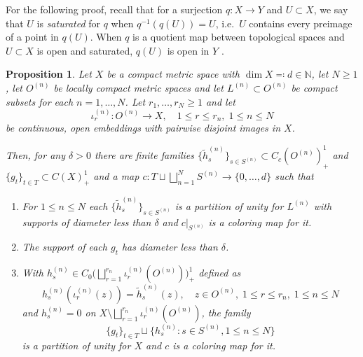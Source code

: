 \documentclass[11pt,a4paper]{amsart}
\newtheorem{proposition}[theorem]{Proposition}
\theoremstyle{definition}
\numberwithin{equation}{section}
\newcommand{\bb}[1]{\mathbb{#1}}
\begin{document}
For the following proof, recall that for a surjection $q\colon X\to Y$ and $U\subset X$, we say that $U$ is \emph{saturated} for $q$ when $q^{-1}(q(U))=U$, i.e.\ $U$ contains every preimage of a point in $q(U)$. When $q$ is a quotient map between topological spaces and $U\subset X$ is open and saturated, $q(U)$ is open in $Y$ \cite{Munkres00}.


\begin{proposition}\label{prop:POU}
Let $X$ be a compact metric space with $\dim X\eqqcolon d\in\bb{N}$, let $N\ge1$, let $O^{(n)}$ be locally compact metric spaces and let $L^{(n)}\subset O^{(n)}$ be compact subsets for each $n=1,\dots,N$. Let $r_1,\dots,r_N\ge 1$ and let
\begin{equation}
\iota_r^{(n)}\colon O^{(n)}\to X,\quad 1\le r\le r_n,\; 1\le n\le N
\end{equation}
be continuous, open embeddings with pairwise disjoint images in $X$.

Then, for any $\delta>0$ there are finite families $\{\tilde{h}_s^{(n)}\}_{s\in S^{(n)}}\subset C_c(O^{(n)})_+^1$ and $\{g_t\}_{t\in T}\subset C(X)_+^1$ and a map $c\colon T\sqcup\bigsqcup_{n=1}^NS^{(n)}\to\{0,\dots,d\}$ such that
\begin{enumerate}[label=\normalfont{(\roman*)}]
\item\label{item:lemmaPOW-2} For $1\le n\le N$ each $\{\tilde{h}_s^{(n)}\}_{s\in S^{(n)}}$ is a partition of unity for $L^{(n)}$ with supports of diameter less than $\delta$ and $c\vert_{S^{(n)}}$ is a coloring map for it.

\item\label{item:lemmaPOW-1} The support of each $g_t$ has diameter less than $\delta$.

\item\label{item:lemmaPOW-3} With $h_s^{(n)}\in C_0\big(\bigsqcup_{r=1}^{r_n}\iota_r^{(n)}(O^{(n)})\big)_+^1$ defined as 
\begin{equation}\label{eq:def-POW-altogether}
h_s^{(n)}(\iota_r^{(n)}(z))=\tilde{h}_s^{(n)}(z),\quad z\in O^{(n)},\; 1\le r\le r_n,\;1\le n\le N
\end{equation}
and $h_s^{(n)}=0$ on $X\setminus \bigsqcup_{r=1}^{r_n}\iota_r^{(n)}(O^{(n)})$, the family
\[
\{g_t\}_{t\in T}\sqcup\{h_s^{(n)}:s\in S^{(n)}, 1\le n\le N\}
\]
is a partition of unity for $X$ and $c$ is a coloring map for it.
\end{enumerate}
\end{proposition}
\end{document}
